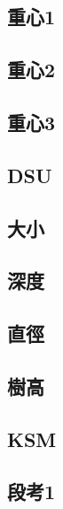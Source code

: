 \subsection{重心1}
    
\subsection{重心2}
    
\subsection{重心3}
    
\subsection{DSU}
    
\subsection{大小}
    
\subsection{深度}
    
\subsection{直徑}
    
\subsection{樹高}
    
\subsection{KSM}
    
\subsection{段考1}
    
